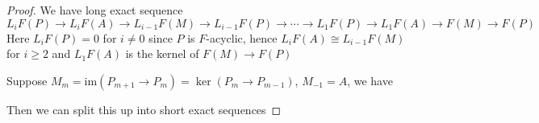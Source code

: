 \documentclass[../main.tex]{subfiles}
\begin{document}
\begin{proof}
We have long exact sequence
\[L_iF(P)\to L_iF(A)\to L_{i-1}F(M)\to L_{i-1}F(P)\to\cdots\to L_1F(P)\to L_1F(A)\to F(M)\to F(P)\]
Here $L_iF(P)=0$ for $i\neq0$ since $P$ is $F$-acyclic, hence $L_iF(A)\cong L_{i-1}F(M)$ for $i\geq2$ and $L_1F(A)$ is the kernel of $F(M)\to F(P)$ \par
Suppose $M_m=\mathrm{im}(P_{m+1}\to P_m)=\ker(P_m\to P_{m-1})$, $M_{-1}=A$, we have
\begin{center}
\end{center}
Then we can split this up into short exact sequences

\end{proof}
\end{document}
